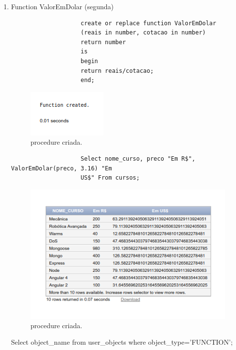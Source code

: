 \documentclass[
article,			%
11pt,				%
oneside,			%
a4paper,			%
english,			%
brazil,				%
sumario=tradicional
]{abntex2}
\begin{document}
\begin{enumerate}
				\item Function ValorEmDolar (segunda)
						\begin{verbatim}
					create or replace function ValorEmDolar
					(reais in number, cotacao in number)
					return number
					is
					begin
					return reais/cotacao;
					end;
						\end{verbatim}
						\begin{center}
							\begin{figure}[H]
								\centering
								\includegraphics[scale=0.5]{./imagens/04.png}
								\caption{procedure criada.}
								\label{rota-1}
							\end{figure}
						\end{center}
						\begin{verbatim}
					Select nome_curso, preco "Em R$", ValorEmDolar(preco, 3.16) "Em
					US$" From cursos;
				    	\end{verbatim}
				   	\begin{center}
						   	\begin{figure}[H]
						   		\centering
						   		\includegraphics[scale=0.5]{./imagens/05.png}
						   		\caption{procedure criada.}
						   		\label{rota-1}
						   	\end{figure}
				   \end{center}
			   
			   Select object\_name from user\_objects where object\_type='FUNCTION';
			   

\end{enumerate}
\end{document}
